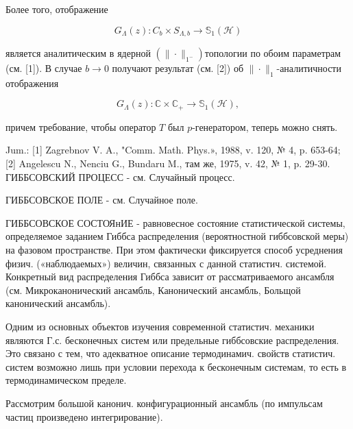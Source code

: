 \documentclass[10pt]{article}
\begin{document}
Более того, отображение



\[

G_{\Lambda}(z): C_{b} \times S_{\Lambda, b} \rightarrow \mathbb{S}_{1}(\mathscr{H})

\]



является аналитическим в ядерной $\left(\|\cdot\|_{1^{-}}\right)$топологии по обоим параметрам (см. [1]). В случае $b \rightarrow 0$ получают результат (см. [2]) об $\|\cdot\|_{1}$-аналитичности отображения



\[

G_{\Lambda}(z): \mathbb{C} \times \mathbb{C}_{+} \rightarrow \mathbb{S}_{1}(\mathscr{H}),

\]



причем требование, чтобы оператор $T$ был $p$-генератором, теперь можно снять.



Jum.: [1] Zagrebnov V. A., "Comm. Math. Phys.», 1988, v. 120, № 4, p. 653-64; [2] Angelescu N., Nenciu G., Bundaru M., там же, 1975, v. 42, № 1, p. 29-30. ГИББСОВСКИЙ ПРОЦЕСС - см. Случайный процесс.



ГИББСОВСКОЕ ПОЛЕ - см. Случайное поле.



ГИББСОВСКОЕ СОСТОЯнИЕ - равновесное состояние статистической системы, определяемое заданием Гиббса распределения (вероятностной гиббсовской меры) на фазовом пространстве. При этом фактически фиксируется способ усреднения физич. («наблюдаемых») величин, связанных с данной статистич. системой. Конкретный вид распределения Гиббса зависит от рассматриваемого ансамбля (см. Микроканонический ансамбль, Канонический ансамбль, Больщой канонический ансамбль).



Одним из основных объектов изучения современной статистич. механики являются Г.с. бесконечных систем или предельные гиббсовские распределения. Это связано с тем, что адекватное описание термодинамич. свойств статистич. систем возможно лишь при условии перехода к бесконечным системам, то есть в термодинамическом пределе.



Рассмотрим большой канонич. конфигурационный ансамбль (по импульсам частиц произведено интегрирование).
\end{document}
